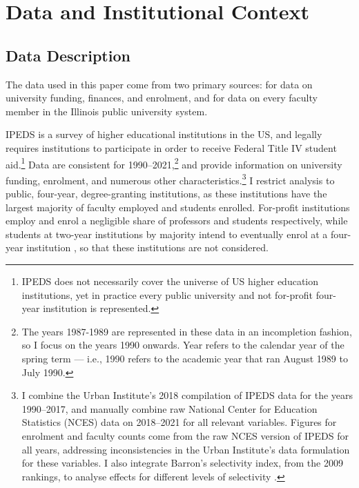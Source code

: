 \section{Data and Institutional Context}
\label{sec:data}

\subsection{Data Description}
The data used in this paper come from two primary sources: \citet[IPEDS]{ipeds} for data on university funding, finances, and enrolment, and \citet[IBHED]{ibhed} for data on every faculty member in the Illinois public university system.

IPEDS is a survey of higher educational institutions in the US, and legally requires institutions to participate in order to receive Federal Title IV student aid.\footnote{
    IPEDS does not necessarily cover the universe of US higher education institutions, yet in practice every public university and not for-profit four-year institution is represented.
}
Data are consistent for 1990--2021,\footnote{
    The years 1987-1989 are represented in these data in an incompletion fashion, so I focus on the years 1990 onwards.
    Year refers to the calendar year of the spring term --- i.e., 1990 refers to the academic year that ran August 1989 to July 1990.
}
and provide information on university funding, enrolment, and numerous other characteristics.\footnote{
    I combine the Urban Institute's 2018 compilation of IPEDS data for the years 1990--2017, and manually combine raw National Center for Education Statistics (NCES) data on 2018--2021 for all relevant variables.
    Figures for enrolment and faculty counts come from the raw NCES version of IPEDS for all years, addressing inconsistencies in the Urban Institute's data formulation for these variables.
    I also integrate Barron's selectivity index, from the 2009 rankings, to analyse effects for different levels of selectivity \citep{barrons2009}.
}
I restrict analysis to public, four-year, degree-granting institutions, as these institutions have the largest majority of faculty employed and students enrolled.
For-profit institutions employ and enrol a negligible share of professors and students respectively, while students at two-year institutions by majority intend to eventually enrol at a four-year institution \citep{mountjoy2022}, so that these institutions are not considered.
